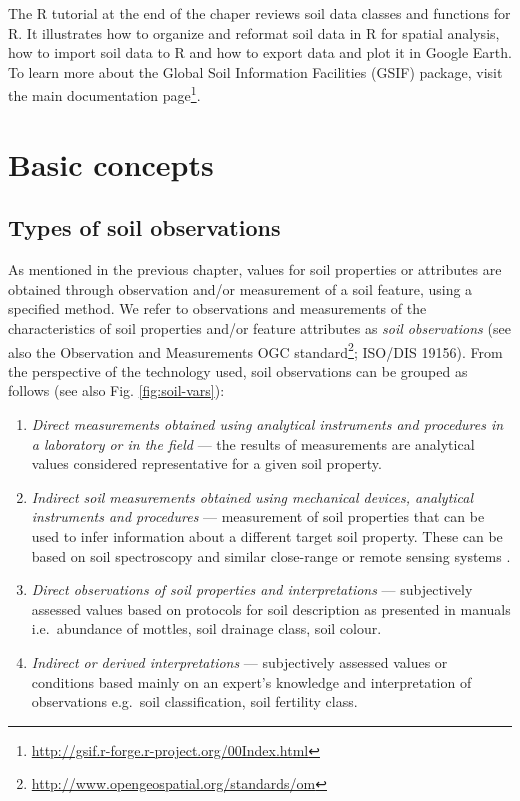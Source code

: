 \documentclass[11pt]{krantz}
\renewcommand{\href}[2]{#2\footnote{\url{#1}}}
\theoremstyle{definition}
\theoremstyle{definition}
\theoremstyle{definition}
\theoremstyle{remark}
\begin{document}
The R tutorial at the end of the chaper reviews soil data classes and
functions for R. It illustrates how to organize and reformat soil data
in R for spatial analysis, how to import soil data to R and how to
export data and plot it in Google Earth. To learn more about the Global
Soil Information Facilities (GSIF) package, visit the main
\href{http://gsif.r-forge.r-project.org/00Index.html}{documentation
page}.

\hypertarget{basic-concepts-1}{%
\section{Basic concepts}\label{basic-concepts-1}}

\hypertarget{types-of-soil-observations}{%
\subsection{Types of soil
observations}\label{types-of-soil-observations}}

As mentioned in the previous chapter, values for soil properties or
attributes are obtained through observation and/or measurement of a soil
feature, using a specified method. We refer to observations and
measurements of the characteristics of soil properties and/or feature
attributes as \emph{soil observations} (see also the
\href{http://www.opengeospatial.org/standards/om}{Observation and
Measurements OGC standard}; ISO/DIS 19156). From the perspective of the
technology used, soil observations can be grouped as follows (see also
Fig. \ref{fig:soil-vars}):

\begin{enumerate}
\def\labelenumi{\arabic{enumi}.}
\item
  \emph{Direct measurements obtained using analytical instruments and
  procedures in a laboratory or in the field} --- the results of
  measurements are analytical values considered representative for a
  given soil property.
\item
  \emph{Indirect soil measurements obtained using mechanical devices,
  analytical instruments and procedures} --- measurement of soil
  properties that can be used to infer information about a different
  target soil property. These can be based on soil spectroscopy and
  similar close-range or remote sensing systems
  \citep{ShepherdWalsh2007JNIS, ViscarraRossel2010DSS}.
\item
  \emph{Direct observations of soil properties and interpretations} ---
  subjectively assessed values based on protocols for soil description
  as presented in manuals i.e.~abundance of mottles, soil drainage
  class, soil colour.
\item
  \emph{Indirect or derived interpretations} --- subjectively assessed
  values or conditions based mainly on an expert's knowledge and
  interpretation of observations e.g.~soil classification, soil
  fertility class.
\end{enumerate}
\end{document}
